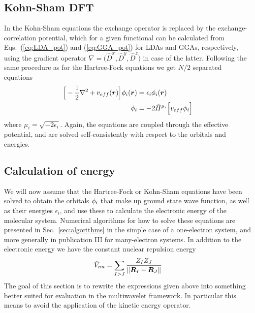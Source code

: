 \subsection{Kohn-Sham DFT}
In the Kohn-Sham equations the exchange operator is replaced by the exchange-correlation 
potential, which for a given functional can be calculated from Eqs.~(\ref{eq:LDA_pot}) and 
(\ref{eq:GGA_pot}) for LDAs and GGAs, respectively, using the gradient operator 
$\nabla=\big(\hat{D}^x,\hat{D}^y,\hat{D}^z\big)$ in case of the latter. Following the same 
procedure as for the Hartree-Fock equations we get $N/2$ separated equations
\begin{align}
    \Big[-\frac{1}{2}\nabla^2+v_{eff}(\boldsymbol r)\Big]\phi_i(\boldsymbol r) 
	    &=\epsilon_i \phi_i(\boldsymbol r)\\
    \phi_i &= -2\hat{H}^{\mu_i}\Big[v_{eff} \phi_i \Big] 
\end{align}
where $\mu_i = \sqrt{-2\epsilon_i}$. Again, the equations are coupled through the effective 
potential, and are solved self-consistently with respect to the orbitals and energies.

\subsection{Calculation of energy}
We will now assume that the Hartree-Fock or Kohn-Sham equations have been solved to obtain
the orbitals $\phi_i$ that make up ground state wave function, as well as their energies 
$\epsilon_i$, and use these to calculate the electronic energy of the molecular system.
Numerical algorithms for how to solve these equations are presented in Sec.~\ref{sec:algorithms} 
in the simple case of a one-electron system, and more generally in
publication III for many-electron systems. In addition to the electronic energy we have 
the constant nuclear repulsion energy
\begin{equation}
    \hat{V}_{nn} = \sum_{I>J} \frac{Z_IZ_J}{\|\boldsymbol R_I-\boldsymbol R_J\|}
\end{equation}
The goal of this section is to rewrite the expressions given above into something better 
suited for evaluation in the multiwavelet framework. In particular this means to avoid
the application of the kinetic energy operator.

